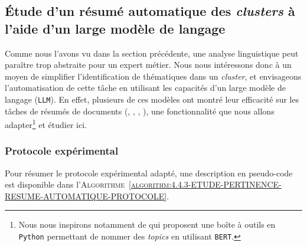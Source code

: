 	
	\subsection{Étude d'un résumé automatique des \textit{clusters} à l'aide d'un large modèle de langage}
	\label{section:4.4.3-ETUDE-PERTINENCE-RESUME-AUTOMATIQUE}
		
		Comme nous l'avons vu dans la section précédente, une analyse linguistique peut paraître trop abstraite pour un expert métier.
		Nous nous intéressons donc à un moyen de simplifier l'identification de thématiques dans un \textit{cluster}, et envisageons l'automatisation de cette tâche en utilisant les capacités d'un large modèle de langage (\texttt{LLM}).
		En effet, plusieurs de ces modèles ont montré leur efficacité sur les tâches de résumés de documents (\cite{zhang-etal:2019:pegasus-pretraining-extracted}, \cite{lewis-etal:2019:bart-denoising-sequencetosequence}, \cite{radford-etal:2019:language-models-are}, \cite{brown-etal:2020:language-models-are}), une fonctionnalité que nous allons adapter\footnote{
			Nous nous inspirons notamment de \cite{alammar-grefenstette:2022:cohere-sandbox} qui proposent une boîte à outils en \texttt{Python} permettant de nommer des \textit{topics} en utilisant \texttt{BERT}.
		}
		et étudier ici.
	
		\subsubsection{Protocole expérimental}
			
			Pour résumer le protocole expérimental adapté, une description en pseudo-code est disponible dans l'\textsc{Algorithme~\ref{algorithm:4.4.3-ETUDE-PERTINENCE-RESUME-AUTOMATIQUE-PROTOCOLE}}.
			
